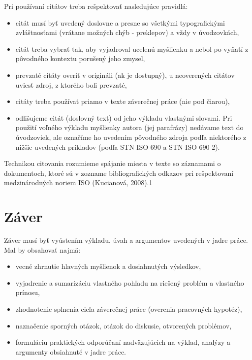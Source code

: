 Pri používaní citátov treba rešpektovať nasledujúce pravidlá:
\begin{itemize}
\item  citát musí byť uvedený doslovne a presne so všetkými typografickými zvláštnosťami (vrátane možných chýb - preklepov) a vždy v úvodzovkách,
\end{itemize}
\begin{itemize}
\item  citát treba vybrať tak, aby vyjadroval ucelenú myšlienku a nebol po vyňatí z pôvodného kontextu porušený jeho zmysel,
\end{itemize}
\begin{itemize}
\item  prevzaté citáty overiť v origináli (ak je dostupný), u neoverených citátov uviesť zdroj, z ktorého boli prevzaté,
\end{itemize}
\begin{itemize}
\item  citáty treba používať priamo v texte záverečnej práce (nie pod čiarou),
\end{itemize}
\begin{itemize}
\item  odlišujeme citát (doslovný text) od jeho výkladu vlastnými slovami. Pri použití voľného výkladu myšlienky autora (jej parafrázy) nedávame text do úvodzoviek, ale označíme ho uvedením pôvodného zdroja podľa niektorého z nižšie uvedených príkladov (podľa STN ISO 690 a STN ISO 690-2).
\end{itemize}
Technikou citovania rozumieme spájanie miesta v texte so záznamami o dokumentoch, ktoré sú v zozname bibliografických odkazov pri rešpektovaní medzinárodných noriem ISO (Kucianová, 2008).1


\chapter{Záver}
Záver musí byť vyústením výkladu, úvah a argumentov uvedených v jadre práce. Mal by obsahovať najmä:
\begin{itemize}
\item  vecné zhrnutie hlavných myšlienok a dosiahnutých výsledkov,
\end{itemize}
\begin{itemize}
\item  vyjadrenie a sumarizáciu vlastného pohľadu na riešený problém a vlastného prínosu,
\end{itemize}
\begin{itemize}
\item  zhodnotenie splnenia cieľa záverečnej práce (overenia pracovných hypotéz),
\end{itemize}
\begin{itemize}
\item  naznačenie sporných otázok, otázok do diskusie, otvorených problémov,
\end{itemize}
\begin{itemize}
\item  formuláciu praktických odporúčaní nadväzujúcich na výklad, analýzy a argumenty obsiahnuté v jadre práce.
\end{itemize}